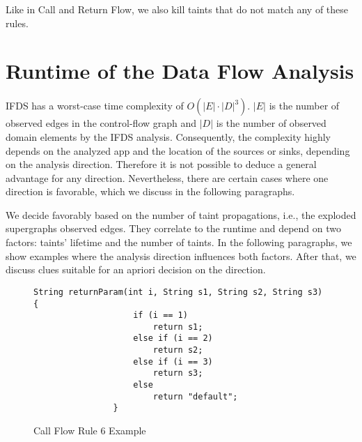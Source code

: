 \documentclass[../draft.tex]{subfiles}
\begin{document}
    Like in Call and Return Flow, we also kill taints that do not match any of these rules.
    
    \section{Runtime of the Data Flow Analysis}\label{s:complexity}
    IFDS has a worst-case time complexity of $O(|E| \cdot |D|^3)$. $|E|$ is the number of observed edges in the control-flow graph and $|D|$ is the number of observed domain elements by the IFDS analysis. 
    Consequently, the complexity highly depends on the analyzed app and the location of the sources or sinks, depending on the analysis direction.
    Therefore it is not possible to deduce a general advantage for any direction.
    Nevertheless, there are certain cases where one direction is favorable, which we discuss in the following paragraphs.

    We decide favorably based on the number of taint propagations, i.e., the exploded supergraphs observed edges. 
    They correlate to the runtime and depend on two factors: taints' lifetime and the number of taints. 
    In the following paragraphs, we show examples where the analysis direction influences both factors. 
    After that, we discuss clues suitable for an apriori decision on the direction.

    \begin{figure}[tbp]
        \centering
        \begin{adjustbox}{max width=\textwidth}
            \begin{lstlisting}[gobble=16]
                String returnParam(int i, String s1, String s2, String s3) {
                    if (i == 1)
                        return s1;
                    else if (i == 2)
                        return s2;
                    else if (i == 3)
                        return s3;
                    else
                        return "default";
                }
            \end{lstlisting}    
        \end{adjustbox}
        \caption{Call Flow Rule 6 Example}
        \label{lst:branching}
    \end{figure}
\end{document}
